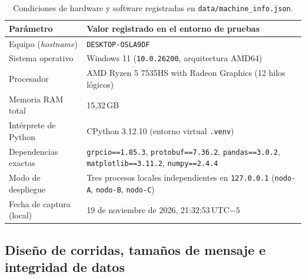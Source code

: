 \documentclass[12pt,a4paper]{article}
\begin{document}
\begin{table}[htbp]
\centering
\caption{Condiciones de hardware y software registradas en \texttt{data/machine\_info.json}.}
\label{tab:hardware_entorno}
\small
\begin{tabular}{lp{10.2cm}}
\toprule
Parámetro & Valor registrado en el entorno de pruebas \\
\midrule
Equipo (\emph{hostname}) & \texttt{DESKTOP-OSLA9DF} \\
Sistema operativo & Windows 11 (\texttt{10.0.26200}, arquitectura AMD64) \\
Procesador & AMD Ryzen 5 7535HS with Radeon Graphics (12 hilos lógicos) \\
Memoria RAM total & 15,32\,GB \\
Intérprete de Python & CPython 3.12.10 (entorno virtual \texttt{.venv}) \\
Dependencias exactas & \texttt{grpcio==1.85.3}, \texttt{protobuf==7.36.2}, \texttt{pandas==3.0.2}, \texttt{matplotlib==3.11.2}, \texttt{numpy==2.4.4} \\
Modo de despliegue & Tres procesos locales independientes en \texttt{127.0.0.1} (\texttt{nodo-A}, \texttt{nodo-B}, \texttt{nodo-C}) \\
Fecha de captura (local) & 19 de noviembre de 2026, 21:32:53\,UTC$-5$ \\
\bottomrule
\end{tabular}
\end{table}

\subsection{Diseño de corridas, tamaños de mensaje e integridad de datos}
\end{document}
